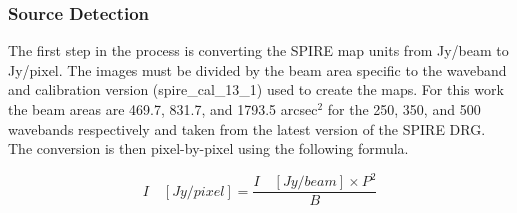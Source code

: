 \subsubsection{Source Detection}
The first step in the process is converting the SPIRE map units from Jy/beam to Jy/pixel. The images must be divided by the beam area specific to the waveband and calibration version (spire_cal_13_1) used to create the maps. For this work the beam areas are 469.7, 831.7, and 1793.5 arcsec$^{2}$ for the 250, 350, and 500 \um{} wavebands respectively and taken from the latest version of the SPIRE DRG. The conversion is then pixel-by-pixel using the following formula.

\begin{equation}\label{eq:convert_unit}
I\quad[Jy/pixel] = \frac{I\quad[Jy/beam] \times P^2}{B}
\end{equation}
  
